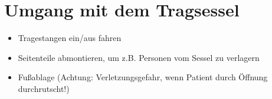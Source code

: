 \chapter{Umgang mit dem Tragsessel}
\begin{itemize}
    \item Tragestangen ein/aus fahren
    \item Seitenteile abmontieren, um z.B. Personen vom Sessel zu verlagern
    \item Fußablage (Achtung: Verletzungsgefahr, wenn Patient durch Öffnung durchrutscht!)
\end{itemize}